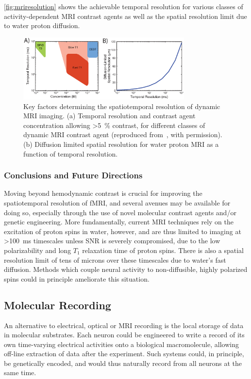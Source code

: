 \autoref{fig:mriresolution} shows the achievable temporal resolution for various classes of activity-dependent MRI contrast agents as well as the spatial resolution limit due to water proton diffusion.

\begin{figure}[htbp]
\caption{Key factors determining the spatiotemporal resolution of dynamic MRI imaging. (a) Temporal resolution and contrast agent concentration allowing \SI{>5}{\percent} contrast, for different classes of dynamic MRI contrast agent (reproduced from~\cite{shapiro06}, with permission). (b) Diffusion limited spatial resolution for water proton MRI as a function of temporal resolution.}
\label{fig:mriresolution}
\centering
\includegraphics[width=0.78\textwidth]{figs/Fig6.eps}
\end{figure}

\subsubsection{Conclusions and Future Directions}

Moving beyond hemodynamic contrast is crucial for improving the spatiotemporal resolution of fMRI, and several avenues may be available for doing so, especially through the use of novel molecular contrast agents and/or genetic engineering. More fundamentally, current MRI techniques rely on the excitation of proton spins in water, however, and are thus limited to imaging at \SI{>100}{\ms} timescales unless SNR is severely compromised, due to the low polarizability and long $T_1$ relaxation time of proton spins.
There is also a spatial resolution limit of tens of microns over these timescales due to water's fast diffusion. Methods which couple neural activity to non-diffusible, highly polarized spins could in principle ameliorate this situation.

\subsection{Molecular Recording}

An alternative to electrical, optical or MRI recording is the local storage of data in molecular substrates.
Each neuron could be engineered to write a record of its own time-varying electrical activities onto a biological macromolecule, allowing off-line extraction of data after the experiment.
Such systems could, in principle, be genetically encoded, and would thus naturally record from all neurons at the same time.

